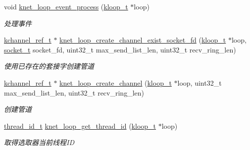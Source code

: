 \begin{DoxyCompactItemize}
void \hyperlink{a00071_a80c9fb216de2e04a4f301ccb4ca7a6f5_a80c9fb216de2e04a4f301ccb4ca7a6f5}{knet\+\_\+loop\+\_\+event\+\_\+process} (\hyperlink{a00053_a97fc76209a58362019f1ded9169e397f_a97fc76209a58362019f1ded9169e397f}{kloop\+\_\+t} $\ast$loop)
\begin{DoxyCompactList}\small\item\em 处理事件 \end{DoxyCompactList}\item 
\hyperlink{a00053_a3b7e82599367eade261456f60ebe2cd9_a3b7e82599367eade261456f60ebe2cd9}{kchannel\+\_\+ref\+\_\+t} $\ast$ \hyperlink{a00108_gaddfd5a2709d0c26ada8a2dd3fd6a5b62_gaddfd5a2709d0c26ada8a2dd3fd6a5b62}{knet\+\_\+loop\+\_\+create\+\_\+channel\+\_\+exist\+\_\+socket\+\_\+fd} (\hyperlink{a00053_a97fc76209a58362019f1ded9169e397f_a97fc76209a58362019f1ded9169e397f}{kloop\+\_\+t} $\ast$loop, \hyperlink{a00053_a0d9e0afbf02fb6ed6c5b1415dce51b05_a0d9e0afbf02fb6ed6c5b1415dce51b05}{socket\+\_\+t} socket\+\_\+fd, uint32\+\_\+t max\+\_\+send\+\_\+list\+\_\+len, uint32\+\_\+t recv\+\_\+ring\+\_\+len)
\begin{DoxyCompactList}\small\item\em 使用已存在的套接字创建管道 \end{DoxyCompactList}\item 
\hyperlink{a00053_a3b7e82599367eade261456f60ebe2cd9_a3b7e82599367eade261456f60ebe2cd9}{kchannel\+\_\+ref\+\_\+t} $\ast$ \hyperlink{a00108_gac1f9a4848c06c2a6a2723d7b991b4394_gac1f9a4848c06c2a6a2723d7b991b4394}{knet\+\_\+loop\+\_\+create\+\_\+channel} (\hyperlink{a00053_a97fc76209a58362019f1ded9169e397f_a97fc76209a58362019f1ded9169e397f}{kloop\+\_\+t} $\ast$loop, uint32\+\_\+t max\+\_\+send\+\_\+list\+\_\+len, uint32\+\_\+t recv\+\_\+ring\+\_\+len)
\begin{DoxyCompactList}\small\item\em 创建管道 \end{DoxyCompactList}\item 
\hyperlink{a00053_ad0ada5642d10ce71bdd90816182f9b79_ad0ada5642d10ce71bdd90816182f9b79}{thread\+\_\+id\+\_\+t} \hyperlink{a00071_a352ae2febcbb9264ef1d5043618bcb80_a352ae2febcbb9264ef1d5043618bcb80}{knet\+\_\+loop\+\_\+get\+\_\+thread\+\_\+id} (\hyperlink{a00053_a97fc76209a58362019f1ded9169e397f_a97fc76209a58362019f1ded9169e397f}{kloop\+\_\+t} $\ast$loop)
\begin{DoxyCompactList}\small\item\em 取得选取器当前线程\+I\+D \end{DoxyCompactList}\item 

\end{DoxyCompactItemize}
